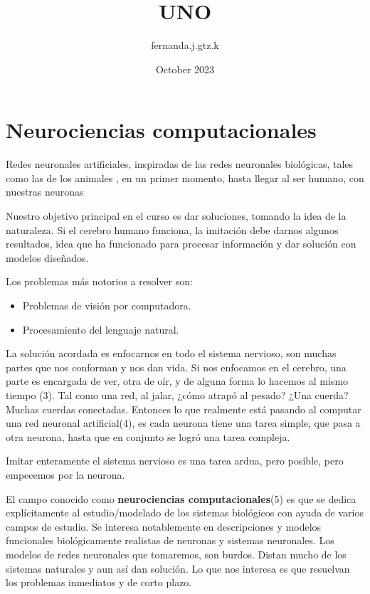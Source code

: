 \documentclass{article}
\title{UNO}
\author{fernanda.j.gtz.k }
\date{October 2023}
\begin{document}
\maketitle




\section{Neurociencias computacionales}



Redes neuronales artificiales, inspiradas de las redes neuronales biológicas, tales como las de los animales %
, en un primer momento, hasta llegar al ser humano, con nuestras neuronas %

Nuestro objetivo principal en el curso es dar soluciones, tomando la idea de la naturaleza. Si el cerebro humano funciona, la imitación debe darnos algunos resultados, idea que ha funcionado para procesar información y dar solución con modelos diseñados. 

Los problemas más notorios a resolver son: 
\begin{itemize}
\item Problemas de visión por computadora.
\item Procesamiento del lenguaje natural.
\end{itemize}

La solución acordada es enfocarnos en todo el sistema nervioso, son muchas partes que nos conforman y nos dan vida. Si nos enfocamos en el cerebro, una parte es encargada de ver, otra de oír, y de alguna forma lo hacemos al mismo tiempo (3). Tal como una red, al jalar, ¿cómo atrapó al pesado? ¿Una cuerda? Muchas cuerdas conectadas. Entonces lo que realmente está pasando al computar una red neuronal artificial(4), es cada neurona tiene una tarea simple, que pasa a otra neurona, hasta que en conjunto se logró una tarea compleja. 

Imitar enteramente el sistema nervioso es una tarea ardua, pero posible, pero empecemos por la neurona.

El campo conocido como \textbf{neurociencias computacionales}(5) es que se dedica explícitamente al estudio/modelado de los sistemas biológicos con ayuda de varios campos de estudio. Se interesa notablemente en descripciones y modelos funcionales biológicamente realistas de neuronas y sistemas neuronales. Los modelos de redes neuronales que tomaremos, son burdos. Distan mucho de los sistemas naturales y aun así dan solución. Lo que nos interesa es que resuelvan los problemas inmediatos y de corto plazo.
\end{document}
